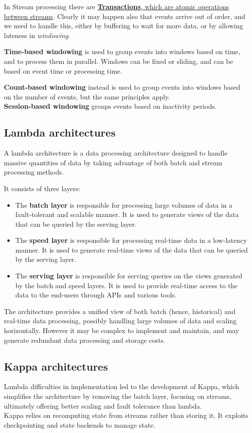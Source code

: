 In Stream processing there are \ul{\textbf{Transactions}, which are atomic operations between streams}.
Clearly it may happen also that events arrive out of order, and we need to handle this, either by buffering to wait for more data, or by allowing lateness in \textit{windowing}.


\textbf{Time-based windowing} is used to group events into windows based on time, and to process them in parallel. Windows can be fixed or sliding, and can be based on event time or processing time.

\textbf{Count-based windowing} instead is used to group events into windows based on the number of events, but the same principles apply. \\
\textbf{Session-based windowing} groups events based on inactivity periods.

\subsection{Lambda architectures}

A lambda architecture is a data processing architecture designed to handle massive quantities of data by taking advantage of both batch and stream processing methods. 
{It consists of three layers:\ns
\begin{itemize}
   \item The \textbf{batch layer} is responsible for processing large volumes of data in a fault-tolerant and scalable manner. It is used to generate views of the data that can be queried by the serving layer.
   \item The \textbf{speed layer} is responsible for processing real-time data in a low-latency manner. It is used to generate real-time views of the data that can be queried by the serving layer.
   \item The \textbf{serving layer} is responsible for serving queries on the views generated by the batch and speed layers. It is used to provide real-time access to the data to the end-users through APIs and various tools.
\end{itemize}
}

The architecture provides a unified view
of both batch (hence, historical) and real-time data
processing, possibly handling large volumes of data and scaling horizontally.
However it may be complex to implement and maintain, and may generate redundant data processing and storage costs.


\subsection{Kappa architectures}
Lambda difficulties in implementation led to the development of Kappa, which simplifies the architecture by removing the batch layer, focusing on streams, ultimately offering better scaling and fault tolerance than lambda.\\
Kappa relies on recomputing state from streams rather than storing it.
It exploits checkpointing and state backends to manage state.


